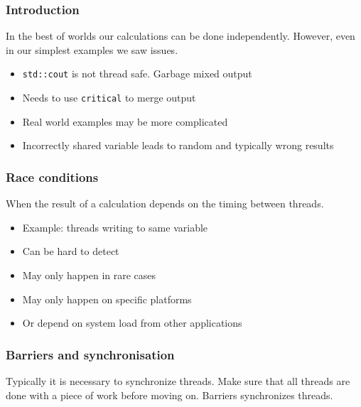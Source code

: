 \subsubsection{Introduction}\label{introduction}

In the best of worlds our calculations can be done independently.
However, even in our simplest examples we saw issues.

\begin{itemize}
\itemsep1pt\parskip0pt
\item
  \texttt{std::cout} is not thread safe. Garbage mixed output
\item
  Needs to use \texttt{critical} to merge output
\item
  Real world examples may be more complicated
\item
  Incorrectly shared variable leads to random and typically wrong
  results
\end{itemize}

\subsubsection{Race conditions}\label{race-conditions}

When the result of a calculation depends on the timing between threads.

\begin{itemize}
\itemsep1pt\parskip0pt
\item
  Example: threads writing to same variable
\item
  Can be hard to detect
\item
  May only happen in rare cases
\item
  May only happen on specific platforms
\item
  Or depend on system load from other applications
\end{itemize}

\subsubsection{Barriers and
synchronisation}\label{barriers-and-synchronisation}

Typically it is necessary to synchronize threads. Make sure that all
threads are done with a piece of work before moving on. Barriers
synchronizes threads.

